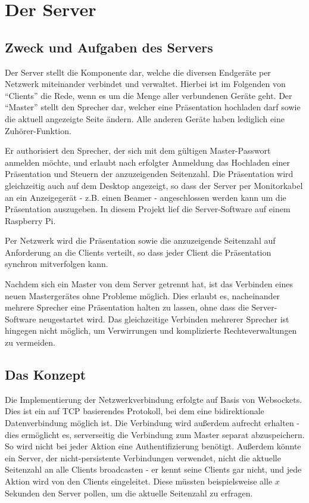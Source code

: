 \chapter{Der Server}
\section{Zweck und Aufgaben des Servers}
Der Server stellt die Komponente dar, welche die diversen Endgeräte per Netzwerk miteinander verbindet und verwaltet. Hierbei ist im Folgenden von "`Clients"' die Rede, wenn es um die Menge aller verbundenen Geräte geht. Der "`Master"' stellt den Sprecher dar, welcher eine Präsentation hochladen darf sowie die aktuell angezeigte Seite ändern. Alle anderen Geräte haben lediglich eine Zuhörer-Funktion.

Er authorisiert den Sprecher, der sich mit dem gültigen Master-Passwort anmelden möchte, und erlaubt nach erfolgter Anmeldung das Hochladen einer Präsentation und Steuern der anzuzeigenden Seitenzahl. Die Präsentation wird gleichzeitig auch auf dem Desktop angezeigt, so dass der Server per Monitorkabel an ein Anzeigegerät - z.B. einen Beamer - angeschlossen werden kann um die Präsentation auszugeben. In diesem Projekt lief die Server-Software auf einem Raspberry Pi.

Per Netzwerk wird die Präsentation sowie die anzuzeigende Seitenzahl auf Anforderung an die Clients verteilt, so dass jeder Client die Präsentation synchron mitverfolgen kann.

Nachdem sich ein Master von dem Server getrennt hat, ist das Verbinden eines neuen Mastergerätes ohne Probleme möglich. Dies erlaubt es, nacheinander mehrere Sprecher eine Präsentation halten zu lassen, ohne dass die Server-Software neugestartet wird. Das gleichzeitige Verbinden mehrerer Sprecher ist hingegen nicht möglich, um Verwirrungen und komplizierte Rechteverwaltungen zu vermeiden.

\section{Das Konzept}
Die Implementierung der Netzwerkverbindung erfolgte auf Basis von Websockets. Dies ist ein auf TCP basierendes Protokoll, bei dem eine bidirektionale Datenverbindung möglich ist. Die Verbindung wird außerdem aufrecht erhalten - dies ermöglicht es, serverseitig die Verbindung zum Master separat abzuspeichern. So wird nicht bei jeder Aktion eine Authentifizierung benötigt. Außerdem könnte ein Server, der nicht-persistente Verbindungen verwendet, nicht die aktuelle Seitenzahl an alle Clients broadcasten - er kennt seine Clients gar nicht, und jede Aktion wird von den Clients eingeleitet. Diese müssten beispielsweise alle $x$ Sekunden den Server pollen, um die aktuelle Seitenzahl zu erfragen.

